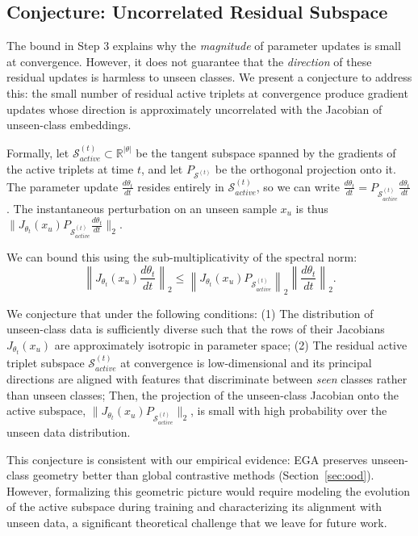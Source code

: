 \documentclass{article}
\begin{document}
\subsection{Conjecture: Uncorrelated Residual Subspace}

The bound in Step 3 explains why the \textit{magnitude} of parameter updates is small at convergence.
However, it does not guarantee that the \textit{direction} of these residual updates is harmless to unseen classes.
We present a conjecture to address this: the small number of residual active triplets at convergence produce gradient updates whose direction is approximately uncorrelated with the Jacobian of unseen-class embeddings.

Formally, let $\mathcal{S}_{active}^{(t)} \subset \mathbb{R}^{|\theta|}$ be the tangent subspace spanned by the gradients of the active triplets at time $t$, and let $P_{\mathcal{S}^{(t)}}$ be the orthogonal projection onto it.
The parameter update $\frac{d\theta_t}{dt}$ resides entirely in $\mathcal{S}_{active}^{(t)}$, so we can write $\frac{d\theta_t}{dt} = P_{\mathcal{S}_{active}^{(t)}} \frac{d\theta_t}{dt}$.
The instantaneous perturbation on an unseen sample $x_u$ is thus $\| J_{\theta_t}(x_u) P_{\mathcal{S}_{active}^{(t)}} \frac{d\theta_t}{dt} \|_2$.

We can bound this using the sub-multiplicativity of the spectral norm:
\begin{equation}
	\left\| J_{\theta_t}(x_u) \frac{d\theta_t}{dt} \right\|_2 \leq \left\| J_{\theta_t}(x_u) P_{\mathcal{S}_{active}^{(t)}} \right\|_2 \left\| \frac{d\theta_t}{dt} \right\|_2.
\end{equation}

We conjecture that under the following conditions: (1) The distribution of unseen-class data is sufficiently diverse such that the rows of their Jacobians $J_{\theta_t}(x_u)$ are approximately isotropic in parameter space; (2) The residual active triplet subspace $\mathcal{S}_{active}^{(t)}$ at convergence is low-dimensional and its principal directions are aligned with features that discriminate between \emph{seen} classes rather than unseen classes; Then, the projection of the unseen-class Jacobian onto the active subspace, $\| J_{\theta_t}(x_u) P_{\mathcal{S}_{active}^{(t)}} \|_2$, is small with high probability over the unseen data distribution.

This conjecture is consistent with our empirical evidence: EGA preserves unseen-class geometry better than global contrastive methods (Section~\ref{sec:ood}).
However, formalizing this geometric picture would require modeling the evolution of the active subspace during training and characterizing its alignment with unseen data, a significant theoretical challenge that we leave for future work.
\end{document}
